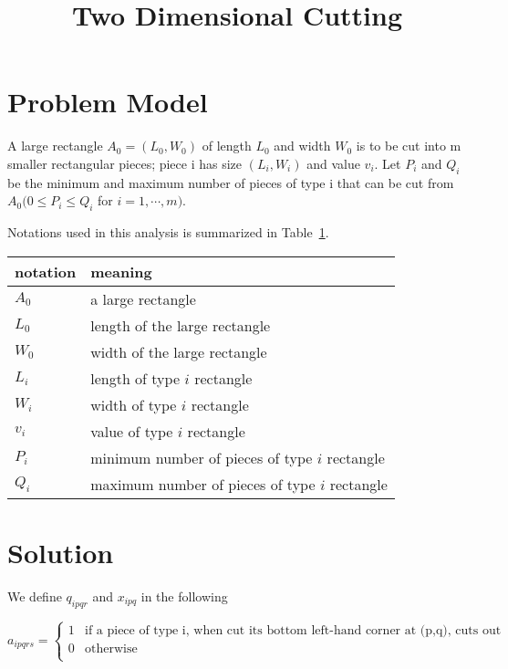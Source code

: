 \documentclass[10 pt,final]{article}
\begin{document}
\title{Two Dimensional Cutting}
\date{}
\maketitle


\section{Problem Model}
A large rectangle $A_0 = (L_0, W_0)$ of length $L_0$ and width $W_0$ is to be cut into m smaller rectangular pieces; piece i has size $(L_i, W_i)$ and value $v_i$. Let $P_i$ and $Q_i$ be the minimum and maximum number of pieces of type i that can be cut from $A_0 (0 \leq P_i \leq Q_i$ for $i=1,\cdots, m)$.

Notations used in this analysis is summarized in Table~\ref{tb_notation}.

\begin{table}[ht!]
\centering
\begin{tabular}{|l|l|}
\hline
notation & meaning \\ \hline
\hline
$A_0$ & a large rectangle \\ \hline
$L_0$ & length of the large rectangle \\ \hline
$W_0$ & width of the large rectangle \\ \hline
$L_i$ & length of type $i$ rectangle \\ \hline 
$W_i$ & width of type $i$ rectangle \\ \hline
$v_i$ & value of type $i$ rectangle \\ \hline 
$P_i$ & minimum number of pieces of type $i$ rectangle \\ \hline 
$Q_i$ & maximum number of pieces of type $i$ rectangle \\ \hline 
\end{tabular}
\label{tb_notation}
\end{table}


\section{Solution}
We define $q_{ipqr}$ and $x_{ipq}$ in the following

\begin{displaymath}
a_{ipqrs} = 
\begin{cases} 
1 &\mbox{if a piece of type i, when cut its bottom left-hand corner at (p,q), cuts out the point (r,s)} \\ 
0 & \mbox{otherwise} \\
\end{cases} 
\end{displaymath}
\end{document}
